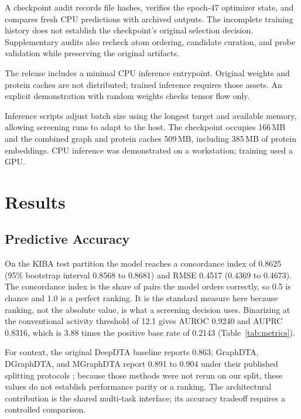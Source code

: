 \documentclass{ieeeaccess}
\begin{document}
A checkpoint audit records file hashes, verifies the epoch-47 optimizer state,
and compares fresh CPU predictions with archived outputs. The incomplete
training history does not establish the checkpoint's original selection
decision. Supplementary audits also recheck atom ordering, candidate curation,
and probe validation while preserving the original artifacts.

The release includes a minimal CPU inference entrypoint. Original weights and
protein caches are not distributed; trained inference requires those assets.
An explicit demonstration with random weights checks tensor flow only.

Inference scripts adjust batch size using the longest target and available
memory, allowing screening runs to adapt to the host. The
checkpoint occupies 166\,MB and the combined graph and protein caches
509\,MB, including 385\,MB of protein embeddings. CPU inference was demonstrated
on a workstation; training used a GPU.

\section{Results}

\subsection{Predictive Accuracy}
\label{sec:accuracy}
On the KIBA test partition the model reaches a concordance index of 0.8625
(95\% bootstrap interval 0.8568 to 0.8681) and RMSE 0.4517 (0.4369 to 0.4673). The
concordance index is the share of pairs the model orders correctly, so 0.5 is
chance and 1.0 is a perfect ranking. It is the standard measure here because
ranking, not the absolute value, is what a screening decision uses.
Binarizing at the conventional activity threshold of 12.1 gives AUROC 0.9240 and
AUPRC 0.8316, which is 3.88 times the positive base rate of 0.2143
(Table~\ref{tab:metrics}).

For context, the original DeepDTA baseline reports 0.863; GraphDTA, DGraphDTA,
and MGraphDTA report 0.891 to 0.904 under their published splitting protocols
\cite{ozturk2018deepdta,nguyen2021graphdta,jiang2020dgraphdta,yang2022mgraphdta};
because those methods were not rerun on our split, these values do not establish
performance parity or a ranking. The architectural contribution is the shared
multi-task interface; its accuracy tradeoff requires a controlled comparison.
\end{document}
